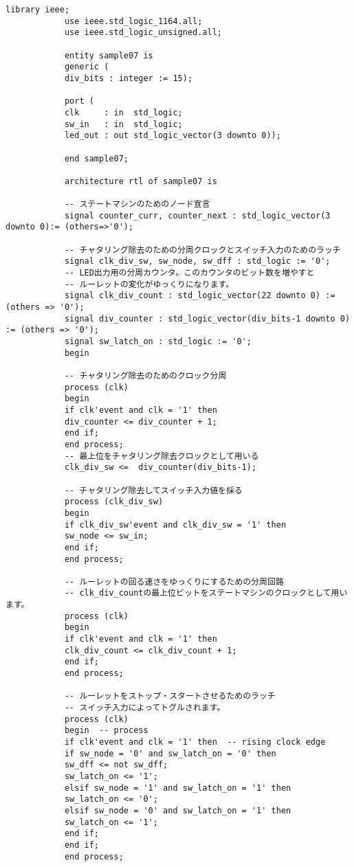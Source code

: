 \documentclass{ltjsarticle}
\begin{document}
		\begin{lstlisting}[caption=sample7, label=sample7]
			library ieee;
			use ieee.std_logic_1164.all;
			use ieee.std_logic_unsigned.all;

			entity sample07 is
			generic (
			div_bits : integer := 15);

			port (
			clk     : in  std_logic;
			sw_in   : in  std_logic;
			led_out : out std_logic_vector(3 downto 0));

			end sample07;

			architecture rtl of sample07 is

			-- ステートマシンのためのノード宣言
			signal counter_curr, counter_next : std_logic_vector(3 downto 0):= (others=>'0');

			-- チャタリング除去のための分周クロックとスイッチ入力のためのラッチ
			signal clk_div_sw, sw_node, sw_dff : std_logic := '0';
			-- LED出力用の分周カウンタ。このカウンタのビット数を増やすと
			-- ルーレットの変化がゆっくりになります。
			signal clk_div_count : std_logic_vector(22 downto 0) := (others => '0');
			signal div_counter : std_logic_vector(div_bits-1 downto 0) := (others => '0');
			signal sw_latch_on : std_logic := '0';
			begin

			-- チャタリング除去のためのクロック分周
			process (clk)
			begin
			if clk'event and clk = '1' then
			div_counter <= div_counter + 1;
			end if;
			end process;
			-- 最上位をチャタリング除去クロックとして用いる
			clk_div_sw <=  div_counter(div_bits-1);

			-- チャタリング除去してスイッチ入力値を採る
			process (clk_div_sw)
			begin
			if clk_div_sw'event and clk_div_sw = '1' then
			sw_node <= sw_in;
			end if;
			end process;

			-- ルーレットの回る速さをゆっくりにするための分周回路
			-- clk_div_countの最上位ビットをステートマシンのクロックとして用います。
			process (clk)
			begin
			if clk'event and clk = '1' then
			clk_div_count <= clk_div_count + 1;
			end if;
			end process;

			-- ルーレットをストップ・スタートさせるためのラッチ
			-- スイッチ入力によってトグルされます。
			process (clk)
			begin  -- process
			if clk'event and clk = '1' then  -- rising clock edge
			if sw_node = '0' and sw_latch_on = '0' then
			sw_dff <= not sw_dff;
			sw_latch_on <= '1';
			elsif sw_node = '1' and sw_latch_on = '1' then
			sw_latch_on <= '0';
			elsif sw_node = '0' and sw_latch_on = '1' then
			sw_latch_on <= '1';
			end if;
			end if;
			end process;


\end{lstlisting}
\end{document}
